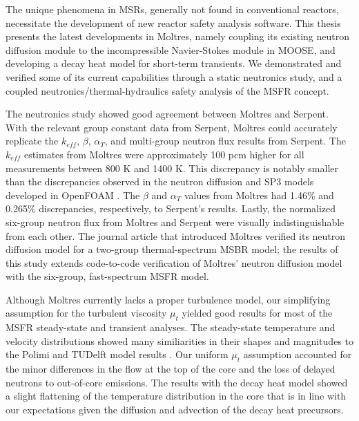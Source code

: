 The unique phenomena in \glspl{MSR}, generally not found in conventional
reactors, necessitate the development of new reactor safety analysis software.
This thesis presents the latest developments in Moltres, namely coupling its
existing neutron diffusion module to the incompressible Navier-Stokes module
in MOOSE, and developing a decay heat model for short-term transients. We
demonstrated and verified some of its current capabilities through a static
neutronics study, and a coupled neutronics/thermal-hydraulics safety analysis
of the \gls{MSFR} concept.

The neutronics study showed good agreement between Moltres and Serpent. With
the relevant group constant data from Serpent,
Moltres could accurately replicate the $k_{eff}$, $\beta$,
$\alpha_T$, and multi-group neutron flux results from Serpent. The
$k_{eff}$ estimates from Moltres were approximately 100 pcm higher for all
measurements between 800 K and 1400 K. This discrepancy is notably smaller
than the discrepancies observed in the neutron diffusion and SP3 models
developed in OpenFOAM \cite{aufiero_extended_2013}. The $\beta$ and $\alpha_T$
values from Moltres had 1.46\% and 0.265\% discrepancies, respectively, to
Serpent's results. Lastly, the normalized six-group neutron flux from Moltres
and Serpent were visually indistinguishable from each other. The journal
article that introduced Moltres \cite{lindsay_introduction_2018} verified its
neutron diffusion model for a two-group thermal-spectrum \gls{MSBR} model;
the results of this study extends code-to-code verification of Moltres'
neutron diffusion model with the six-group, fast-spectrum \gls{MSFR} model.

Although Moltres currently lacks a proper turbulence model, our simplifying
assumption for the turbulent viscosity $\mu_t$ yielded good results for most
of the \gls{MSFR}
steady-state and transient analyses. The steady-state temperature and velocity
distributions showed many similiarities in their shapes and magnitudes to the
Polimi and TUDelft model results \cite{fiorina_modelling_2014}. Our
uniform $\mu_t$ assumption accounted for the minor differences in the flow at
the top of the core and the loss of delayed neutrons to out-of-core emissions.
The results with the decay heat model showed a slight flattening of the
temperature distribution in the core that is in line with our expectations
given the diffusion and advection of the decay heat precursors.

